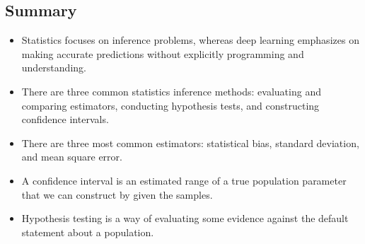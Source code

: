\documentclass[letterpaper,11pt,english]{sphinxmanual}
\begin{document}
\begin{sphinxVerbatim}[commandchars=\\\{\}]
  

    

  

  
  
     
\end{sphinxVerbatim}


\subsection{Summary}
\label{\detokenize{chapter_appendix_math/statistics:summary}}\begin{itemize}
\item {} 
Statistics focuses on inference problems, whereas deep learning
emphasizes on making accurate predictions without explicitly
programming and understanding.

\item {} 
There are three common statistics inference methods: evaluating and
comparing estimators, conducting hypothesis tests, and constructing
confidence intervals.

\item {} 
There are three most common estimators: statistical bias, standard
deviation, and mean square error.

\item {} 
A confidence interval is an estimated range of a true population
parameter that we can construct by given the samples.

\item {} 
Hypothesis testing is a way of evaluating some evidence against the
default statement about a population.

\end{itemize}
\end{document}
